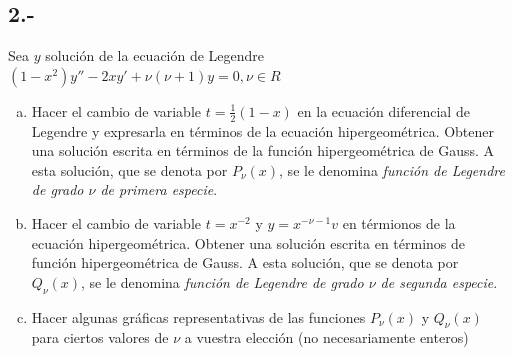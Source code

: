 \documentclass{article}
\begin{document}
\subsection*{2.-}
Sea $y$ solución de la ecuación de Legendre $(1-x^2)y''-2xy'+ \nu(\nu+1)y=0, \nu \in R$
\begin{enumerate}[a)]
    \item Hacer el cambio de variable $t=\frac{1}{2}(1-x)$ en la ecuación diferencial de Legendre y 
    expresarla en términos de la ecuación hipergeométrica. Obtener una solución escrita en términos de la función 
    hipergeométrica de Gauss. A esta solución, que se denota por $P_\nu(x)$, se le denomina \textit{función de Legendre de grado $\nu$ de primera especie}.
    \item Hacer el cambio de variable $t=x^{-2}$ y $y=x^{-\nu-1}v$ en térmionos de la ecuación hipergeométrica. Obtener una solución escrita en términos de
    función hipergeométrica de Gauss. A esta solución, que se denota por $Q_\nu(x)$, se le denomina 
    \textit{función de Legendre de grado $\nu$ de segunda especie}.
    \item Hacer algunas gráficas representativas de las funciones $P_\nu(x)$ y $Q_\nu(x)$ para ciertos valores de $\nu$ a vuestra elección
    (no necesariamente enteros)
\end{enumerate}
\end{document}
